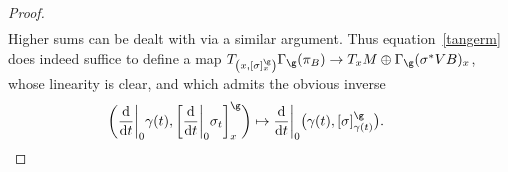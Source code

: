 \begin{proof}
\begin{gather*}
\end{gather*}
Higher sums can be dealt with via a similar argument. Thus equation~\eqref{tangerm} does indeed suffice to define a map $T_{\left(x,[\sigma]^{\g}_{x}\right)}\Gamma_{\g}(\pi_{B})\rightarrow T_{x}M\oplus\Gamma_{\g}(\sigma^{*}VB)_{x}$, whose linearity is clear, and which admits the obvious inverse
\begin{gather*}
\bigg(\frac{\rm d}{{\rm d}t}\bigg|_{0}\gamma(t),\bigg[\frac{\rm d}{{\rm d}t}\bigg|_{0}\sigma_{t}\bigg]^{\g}_{x}\bigg)\mapsto \frac{\rm d}{{\rm d}t}\bigg|_{0}\big(\gamma(t),[\sigma]^{\g}_{\gamma(t)}\big).\tag*{\qed}
\end{gather*}
\renewcommand{\qed}{}
\end{proof}
